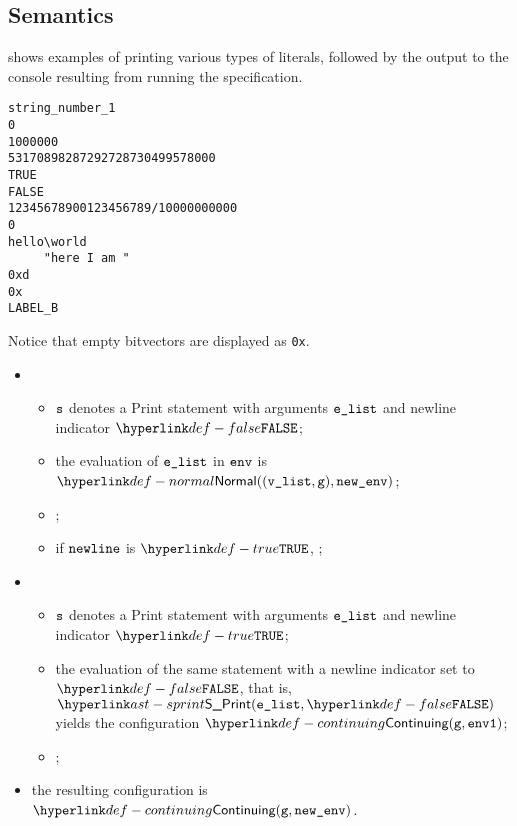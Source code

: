 \subsection{Semantics}

 shows examples of printing various types of literals,
followed by the output to the console resulting from running the specification.
\begin{Verbatim}[fontsize=\footnotesize, frame=single]
string_number_1
0
1000000
53170898287292728730499578000
TRUE
FALSE
12345678900123456789/10000000000
0
hello\world
	 "here I am "
0xd
0x
LABEL_B
\end{Verbatim}

Notice that empty bitvectors are displayed as \verb|0x|.

\ProseParagraph
\OneApplies
\begin{itemize}
  \item {}
  \begin{itemize}
    \item $\texttt{s}$ denotes a Print statement with arguments $\texttt{e\_list}$ and newline indicator $\False$;
    \item the evaluation of $\texttt{e\_list}$ in $\texttt{env}$ is $\Normal((\vlist, \vg), \newenv)$\ProseOrAbnormal;
    \item {};
    \item if $\texttt{newline}$ is $\True$, ;
  \end{itemize}

  \item {}
  \begin{itemize}
    \item $\texttt{s}$ denotes a Print statement with arguments $\texttt{e\_list}$ and newline indicator $\True$;
    \item the evaluation of the same statement with a newline indicator set to $\False$, that is,
          $\SPrint(\elist, \False)$ yields the configuration $\Continuing(\vg, \envone)$\ProseOrAbnormal;
    \item {};
  \end{itemize}
  \item the resulting configuration is $\Continuing(\vg, \newenv)$.
\end{itemize}

